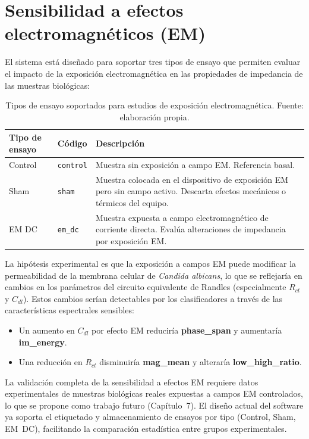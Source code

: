 \documentclass[11pt,a4paper,spanish]{book}
\begin{document}
\section{Sensibilidad a efectos electromagn\'{e}ticos (EM)}
\label{sec:em-sensitivity}

El sistema est\'{a} dise\~{n}ado para soportar tres tipos de ensayo que permiten evaluar el impacto de la exposici\'{o}n electromagn\'{e}tica en las propiedades de impedancia de las muestras biol\'{o}gicas:

\begin{table}[ht]
\centering
\begin{tabular}{l l p{7.5cm}}
\hline\hline
Tipo de ensayo & C\'{o}digo & Descripci\'{o}n \\ [0.5ex]
\hline
Control & \texttt{control} & Muestra sin exposici\'{o}n a campo EM. Referencia basal. \\
Sham & \texttt{sham} & Muestra colocada en el dispositivo de exposici\'{o}n EM pero sin campo activo. Descarta efectos mec\'{a}nicos o t\'{e}rmicos del equipo. \\
EM DC & \texttt{em\_dc} & Muestra expuesta a campo electromagn\'{e}tico de corriente directa. Eval\'{u}a alteraciones de impedancia por exposici\'{o}n EM. \\
\hline
\end{tabular}
\caption[Tipos de ensayo EM]{Tipos de ensayo soportados para estudios de exposici\'{o}n electromagn\'{e}tica. Fuente: elaboraci\'{o}n propia.}
\label{tab:tipos-ensayo-em}
\end{table}

La hip\'{o}tesis experimental es que la exposici\'{o}n a campos EM puede modificar la permeabilidad de la membrana celular de \textit{Candida albicans}, lo que se reflejar\'{i}a en cambios en los par\'{a}metros del circuito equivalente de Randles (especialmente $R_{ct}$ y $C_{dl}$). Estos cambios ser\'{i}an detectables por los clasificadores a trav\'{e}s de las caracter\'{i}sticas espectrales sensibles:

\begin{itemize}
	\item Un aumento en $C_{dl}$ por efecto EM reducir\'{i}a \textbf{phase\_span} y aumentar\'{i}a \textbf{im\_energy}.
	\item Una reducci\'{o}n en $R_{ct}$ disminuir\'{i}a \textbf{mag\_mean} y alterar\'{i}a \textbf{low\_high\_ratio}.
\end{itemize}

La validaci\'{o}n completa de la sensibilidad a efectos EM requiere datos experimentales de muestras biol\'{o}gicas reales expuestas a campos EM controlados, lo que se propone como trabajo futuro (Cap\'{i}tulo~7). El dise\~{n}o actual del software ya soporta el etiquetado y almacenamiento de ensayos por tipo (Control, Sham, EM~DC), facilitando la comparaci\'{o}n estad\'{i}stica entre grupos experimentales.
\end{document}
